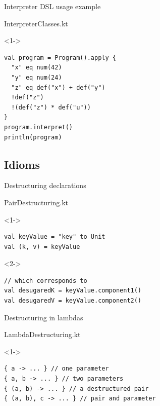 \documentclass[hyperref={pdfpagelabels=false},xcolor={dvipsnames},compress]{beamer}
\begin{document}
    \begin{frame}[fragile]{Interpreter DSL usage example}
        \begin{exampleblock}{InterpreterClasses.kt}
            \begin{onlyenv}<1->
                \begin{lstlisting}
val program = Program().apply {
  "x" eq num(42)
  "y" eq num(24)
  "z" eq def("x") + def("y")
  !def("z")
  !(def("z") * def("u"))
}
program.interpret()
println(program)
                \end{lstlisting}
            \end{onlyenv}
        \end{exampleblock}
    \end{frame}

    \subsection{Idioms}

    \begin{frame}[fragile]{Destructuring declarations}
        \begin{exampleblock}{PairDestructuring.kt}
            \begin{onlyenv}<1->
                \begin{lstlisting}
val keyValue = "key" to Unit
val (k, v) = keyValue
                \end{lstlisting}
            \end{onlyenv}
            \begin{onlyenv}<2->
                \begin{lstlisting}
// which corresponds to 
val desugaredK = keyValue.component1()
val desugaredV = keyValue.component2()
                \end{lstlisting}
            \end{onlyenv}
        \end{exampleblock}
    \end{frame}

    \begin{frame}[fragile]{Destructuring in lambdas}
        \begin{exampleblock}{LambdaDestructuring.kt}
            \begin{onlyenv}<1->
                \begin{lstlisting}
{ a -> ... } // one parameter
{ a, b -> ... } // two parameters
{ (a, b) -> ... } // a destructured pair
{ (a, b), c -> ... } // pair and parameter
                \end{lstlisting}
            \end{onlyenv}
        \end{exampleblock}
    \end{frame}
\end{document}
